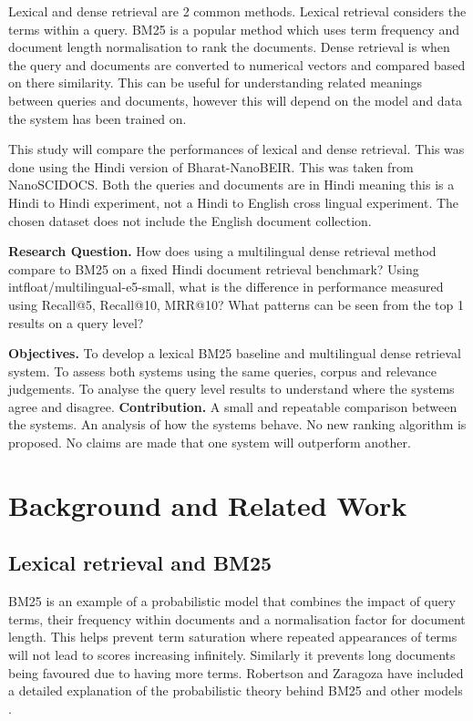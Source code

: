 \documentclass[10pt]{article}
\begin{document}
Lexical and dense retrieval are 2 common methods. Lexical retrieval considers the terms within a query. BM25 is a popular method which uses term frequency and document length normalisation to rank the documents. Dense retrieval is when the query and documents are converted to numerical vectors and compared based on there similarity. This can be useful for understanding related meanings between queries and documents, however this will depend on the model and data the system has been trained on.

This study will compare the performances of lexical and dense retrieval. This was done using the Hindi version of Bharat-NanoBEIR. This was taken from NanoSCIDOCS. Both the queries and documents are in Hindi meaning this is a Hindi to Hindi experiment, not a Hindi to English cross lingual experiment. The chosen dataset does not include the English document collection.

\textbf{Research Question.} How does using a multilingual dense retrieval method compare to BM25 on a fixed Hindi document retrieval benchmark? Using intfloat/multilingual-e5-small, what is the difference in performance measured using Recall@5, Recall@10, MRR@10? What patterns can be seen from the top 1 results on a query level?

\textbf{Objectives.} To develop a lexical BM25 baseline and multilingual dense retrieval system. To assess both systems using the same queries, corpus and relevance judgements. To analyse the query level results to understand where the systems agree and disagree. \textbf{Contribution.} A small and repeatable comparison between the systems. An analysis of how the systems behave. No new ranking algorithm is proposed. No claims are made that one system will outperform another.

\section{Background and Related Work}
\subsection{Lexical retrieval and BM25}
BM25 is an example of a probabilistic model that combines the impact of query terms, their frequency within documents and a normalisation factor for document length. This helps prevent term saturation where repeated appearances of terms will not lead to scores increasing infinitely. Similarly it prevents long documents being favoured due to having more terms. Robertson and Zaragoza have included a detailed explanation of the probabilistic theory behind BM25 and other models . \cite{robertson2009bm25}
\end{document}

